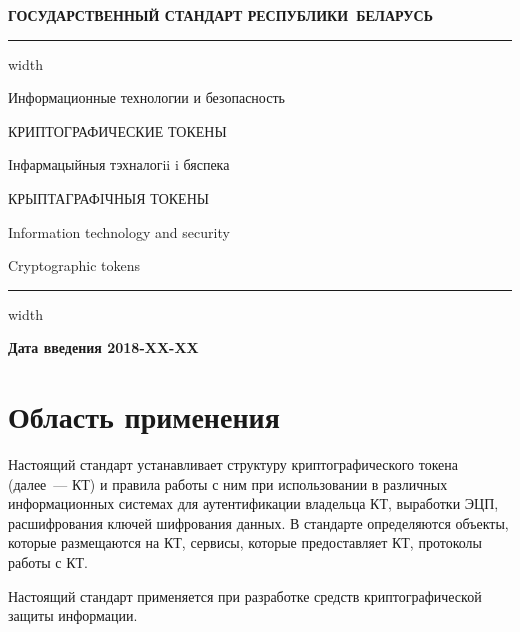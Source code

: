\newpage
\setcounter{page}{1}
\pagestyle{headings}

\begin{center}
{\bfseries
ГОСУДАРСТВЕННЫЙ СТАНДАРТ РЕСПУБЛИКИ~БЕЛАРУСЬ
\vskip 2pt
\hrule width\textwidth

\vskip 9pt

Информационные технологии и безопасность

КРИПТОГРАФИЧЕСКИЕ ТОКЕНЫ

\vskip 9pt

Iнфармацыйныя тэхналогii i бяспека

КРЫПТАГРАФIЧНЫЯ ТОКЕНЫ
} %

\vskip 9pt

Information technology and security

Cryptographic tokens

\vskip 4pt                
\hrule width \textwidth
\end{center}

\mbox{}\hfill{\bfseries Дата введения 2018-XX-XX}

\chapter{Область применения}

Настоящий стандарт устанавливает структуру 
криптографического токена (далее~--- КТ) и правила 
работы с ним при использовании в различных информационных системах 
для аутентификации владельца КТ, 
выработки ЭЦП, расшифрования ключей шифрования данных.
%
В стандарте определяются объекты, которые размещаются на КТ,
сервисы, которые предоставляет КТ, протоколы работы с КТ.

Настоящий стандарт применяется при разработке средств криптографической 
защиты информации.

